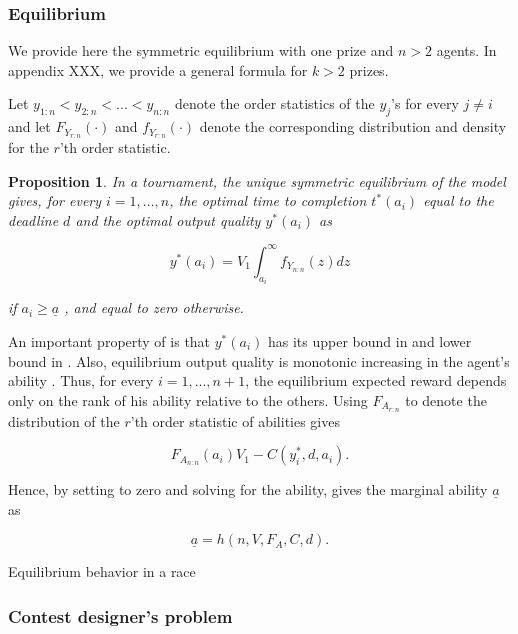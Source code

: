 \documentclass[12pt,]{article}
\newtheorem{proposition}{Proposition}
\begin{document}
\subsubsection{Equilibrium}\label{equilibrium}

We provide here the symmetric equilibrium with one prize and \(n>2\)
agents. In appendix XXX, we provide a general formula for \(k>2\)
prizes.

Let \(y_{1:n} < y_{2:n} < ... < y_{n:n}\) denote the order statistics of
the \(y_j\)'s for every \(j\neq i\) and let \({F_{Y_{r:n}}}(\cdot)\) and
\({f_{Y_{r:n}}}(\cdot)\) denote the corresponding distribution and
density for the \(r\)'th order statistic.

\begin{proposition}

In a tournament, the unique symmetric equilibrium of the model gives,
for every \(i=1, ..., n\), the optimal time to completion \(t^*(a_i)\)
equal to the deadline \(d\) and the optimal output quality \(y^*(a_i)\)
as

\[\label{eq: optimal bid tournament}
  y^*(a_i) =  V_1 \int_{a_i}^\infty {f_{Y_{n:n}}} (z) dz\]

if \({a_i}\geq {\underline a}\) \citep[see][]{moldovanu2001optimal}, and
equal to zero otherwise.

\end{proposition}

An important property of is that \(y^*(a_i)\) has its upper bound in and
lower bound in . Also, equilibrium output quality is monotonic
increasing in the agent's ability \citep[see][]{moldovanu2001optimal}.
Thus, for every \(i=1, ..., n+1\), the equilibrium expected reward
depends only on the rank of his ability relative to the others. Using
\({F_{A_{r:n}}}\) to denote the distribution of the \(r\)'th order
statistic of abilities gives

\[\label{eq: expected payoffs tournament}
  {F_{A_{n:n}}}(a_i) V_1  - C(y_i^*, d, a_i).\]

Hence, by setting to zero and solving for the ability, gives the
marginal ability \({\underline a}\) as

\[{\underline a}= h(n, V, F_A, C, d).\]

\begin{corollary}

Equilibrium behavior in a race

\end{corollary}

\subsubsection{Contest designer's
problem}\label{contest-designers-problem}
\end{document}
